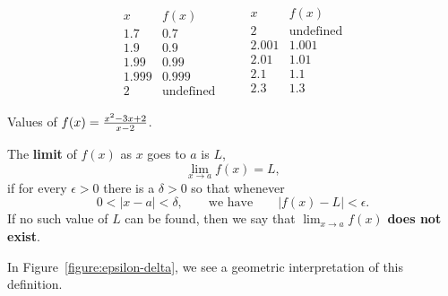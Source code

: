 \begin{margintable}[-1in]
\[
\begin{array}{c|c}
 x & f(x) \\ \hline
 1.7 &  0.7 \\
 1.9 &  0.9 \\
 1.99 &  0.99 \\
 1.999 &  0.999 \\
  2 &  \text{undefined}
\end{array}\qquad
\begin{array}{c|c}
 x & f(x) \\ \hline
  2 & \text{undefined}\\
 2.001&  1.001\\
 2.01&  1.01\\
 2.1 &  1.1 \\
 2.3 &  1.3 \\
\end{array}
\]
\caption{Values of $f(x)=\protect\frac{x^2 - 3x + 2}{x-2}$.}
\label{table:(x^2 - 3x + 2)/(x-2)}
\end{margintable}

\begin{definition}\label{def:limit}
The \textbf{limit} of $f(x)$ as $x$ goes to $a$ is $L$,
\[
\lim_{x\to a}f(x)=L,
\] 
if for every $\epsilon>0$ there is a $\delta > 0$ so that whenever
\[
0 < |x-a| < \delta, \qquad\text{we have} \qquad |f(x)-L|<\epsilon.
\] 
If no such value of $L$ can be
found, then we say that $\lim_{x\to a}f(x)$ \textbf{does not exist}.
\end{definition}

In Figure~\ref{figure:epsilon-delta}, we see a geometric
interpretation of this definition.

